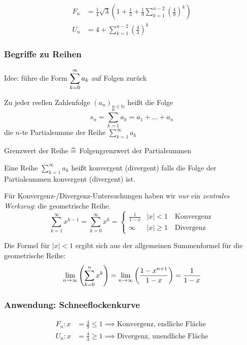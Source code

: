 \begin{align*}
    F_n &= \frac{1}{4} \sqrt{3} \left( 1 + \frac{1}{3} + \frac{1}{9} \sum_{k=1}^{n-2} \left( \frac{4}{9} \right)^k \right) \\
    U_n &= 4 + \sum_{k=1}^{n-2} \left( \frac{4}{3} \right)^k
\end{align*}

\subsubsection*{Begriffe zu Reihen}

Idee: führe die Form $\displaystyle\sum_{k=0}^{\infty} a_k$ auf Folgen zurück

\begin{definition}[Partialsumme] Zu jeder reellen Zahlenfolge $(a_n)_{n \in \mathbb{N}}$ heißt die Folge
\begin{equation*}
    s_n = \sum_{k=1}^n a_k = a_1 + \dots + a_n
\end{equation*}
die $n$-te Partialsumme der Reihe $\sum_{k=1}^{\infty} a_k$
\end{definition}

\noindent Grenzwert der Reihe $\mathrel{\widehat{=}}$ Folgengrenzwert der Partialsummen

\begin{definition}
Eine Reihe $\sum_{k=1}^{\infty} a_k$ heißt konvergent (divergent) falls die Folge der Partialsummen konvergent (divergent) ist.
\end{definition}

\noindent Für Konvergenz-/Divergenz-Untersuchungen haben wir \emph{nur} ein \emph{zentrales Werkzeug}: die geometrische Reihe.
\begin{equation*}
    \sum_{k=1}^{\infty} x^{k-1} = \sum_{k=0}^{\infty} x^k =
    \begin{cases}
        \frac{1}{1-x} & |x| < 1 \quad\text{Konvergenz}\\
        \infty & |x| \geq 1 \quad\text{Divergenz}
    \end{cases}
\end{equation*}

\begin{note}
  Die Formel für $|x| < 1$ ergibt sich aus der allgemeinen Summenformel für die geometrische Reihe:
  \[ \lim_{n \rightarrow \infty} \left( \sum_{k=0}^{n} x^k \right) = \lim_{n \rightarrow \infty} \left(  \frac{1-x^{n+1}}{1-x} \right) = \frac{1}{1-x} \]
\end{note}


\subsubsection*{Anwendung: Schneeflockenkurve}
\begin{align*}
    F_n: x &= \frac{4}{9} \le 1 \implies \text{Konvergenz, endliche Fläche} \\
    U_n: x &= \frac{4}{3} \ge 1 \implies \text{Divergenz, unendliche Fläche}
\end{align*}

